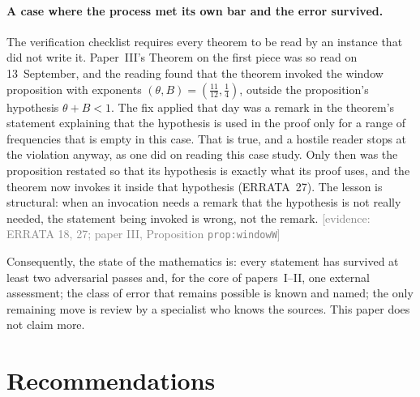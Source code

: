 \documentclass[11pt,a4paper]{article}
\newcommand{\evidence}[1]{{\footnotesize\textcolor{Gray}{[evidence: #1]}}}
\begin{document}
\paragraph{A case where the process met its own bar and the error survived.} The verification checklist requires
every theorem to be read by an instance that did not write it. Paper~III's Theorem on the first piece was so read on
13~September, and the reading found that the theorem invoked the window proposition with exponents
$(\theta,B)=(\tfrac{11}{12},\tfrac14)$, outside the proposition's hypothesis $\theta+B<1$. The fix applied that day was
a remark in the theorem's statement explaining that the hypothesis is used in the proof only for a range of
frequencies that is empty in this case. That is true, and a hostile reader stops at the violation anyway, as one did
on reading this case study. Only then was the proposition restated so that its hypothesis is exactly what its proof
uses, and the theorem now invokes it inside that hypothesis (ERRATA~27). The lesson is structural: when an invocation
needs a remark that the hypothesis is not really needed, the statement being invoked is wrong, not the remark.
\evidence{ERRATA 18, 27; paper III, Proposition \texttt{prop:windowW}}

Consequently, the state of the mathematics is: every statement has survived at least two adversarial passes and,
for the core of papers~I--II, one external assessment; the class of error that remains possible is known and
named; the only remaining move is review by a specialist who knows the sources. This paper does not claim more.

\section{Recommendations}\label{sec:recommend}
\end{document}
